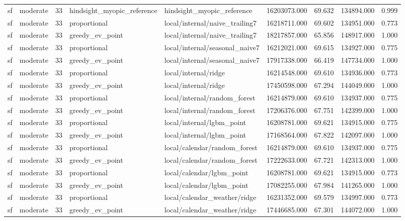 \begin{tabular}{llrllrrrr}
sf & moderate & 33 & hindsight\_myopic\_reference & hindsight\_myopic\_reference & 16203073.000 & 69.632 & 134894.000 & 0.999 \\
sf & moderate & 33 & proportional & local/internal/naive\_trailing7 & 16218711.000 & 69.602 & 134951.000 & 0.773 \\
sf & moderate & 33 & greedy\_ev\_point & local/internal/naive\_trailing7 & 18217857.000 & 65.856 & 148917.000 & 1.000 \\
sf & moderate & 33 & proportional & local/internal/seasonal\_naive7 & 16212021.000 & 69.615 & 134927.000 & 0.775 \\
sf & moderate & 33 & greedy\_ev\_point & local/internal/seasonal\_naive7 & 17917338.000 & 66.419 & 147734.000 & 1.000 \\
sf & moderate & 33 & proportional & local/internal/ridge & 16214548.000 & 69.610 & 134936.000 & 0.773 \\
sf & moderate & 33 & greedy\_ev\_point & local/internal/ridge & 17450598.000 & 67.294 & 144049.000 & 1.000 \\
sf & moderate & 33 & proportional & local/internal/random\_forest & 16214879.000 & 69.610 & 134937.000 & 0.775 \\
sf & moderate & 33 & greedy\_ev\_point & local/internal/random\_forest & 17206376.000 & 67.751 & 142399.000 & 1.000 \\
sf & moderate & 33 & proportional & local/internal/lgbm\_point & 16208781.000 & 69.621 & 134915.000 & 0.775 \\
sf & moderate & 33 & greedy\_ev\_point & local/internal/lgbm\_point & 17168564.000 & 67.822 & 142097.000 & 1.000 \\
sf & moderate & 33 & proportional & local/calendar/random\_forest & 16214879.000 & 69.610 & 134937.000 & 0.775 \\
sf & moderate & 33 & greedy\_ev\_point & local/calendar/random\_forest & 17222633.000 & 67.721 & 142313.000 & 1.000 \\
sf & moderate & 33 & proportional & local/calendar/lgbm\_point & 16208781.000 & 69.621 & 134915.000 & 0.773 \\
sf & moderate & 33 & greedy\_ev\_point & local/calendar/lgbm\_point & 17082255.000 & 67.984 & 141265.000 & 1.000 \\
sf & moderate & 33 & proportional & local/calendar\_weather/ridge & 16231352.000 & 69.579 & 134997.000 & 0.773 \\
sf & moderate & 33 & greedy\_ev\_point & local/calendar\_weather/ridge & 17446685.000 & 67.301 & 144072.000 & 1.000 \\

\end{tabular}
